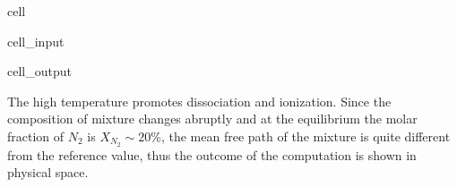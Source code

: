 \documentclass[letterpaper,10pt,english]{jupyterBook}
\begin{document}
\begin{sphinxuseclass}{cell}\begin{sphinxVerbatimInput}

\begin{sphinxuseclass}{cell_input}
\begin{sphinxVerbatim}[commandchars=\\\{\}]
  

      

\PYG{p}{[}\PYG{p}{]}
\PYG{p}{[}\PYG{p}{]}

\PYG{p}{[}\PYG{p}{]}   
\PYG{p}{[}\PYG{p}{]}   

\end{sphinxVerbatim}

\end{sphinxuseclass}\end{sphinxVerbatimInput}
\begin{sphinxVerbatimOutput}

\begin{sphinxuseclass}{cell_output}
\noindent{}

\end{sphinxuseclass}\end{sphinxVerbatimOutput}

\end{sphinxuseclass}
\sphinxAtStartPar
The high temperature promotes dissociation and ionization. Since the composition of mixture changes abruptly and at the equilibrium the molar fraction of \(N_2\) is \(X_{N_2}\sim 20\%\), the mean free path of the mixture is quite different from the reference value, thus the outcome of the computation is shown in physical space.
\end{document}
